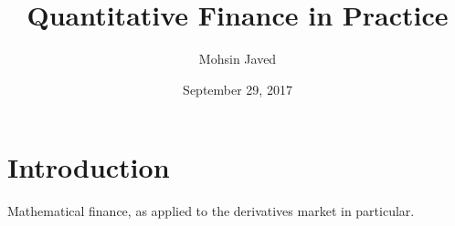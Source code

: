 \documentclass{amsart}
\theoremstyle{plain}
\numberwithin{equation}{section}
\begin{document}
\title[Quant Finance]{Quantitative Finance in Practice}
\author{Mohsin Javed}
\address[London]
{Pret A Manger, Marble Arch Station, \newline%
\indent Oxford Street, London}%
%
\date{September 29, 2017}


\maketitle

\section{Introduction}
Mathematical finance, as applied to the 
derivatives market in particular.
\end{document}
